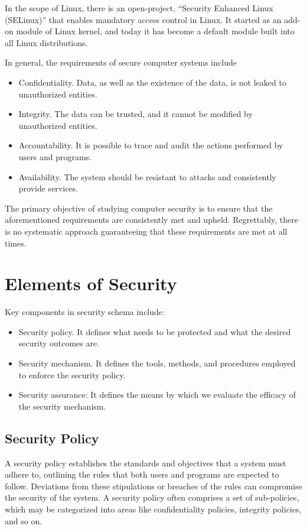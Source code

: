 In the scope of Linux, there is an open-project, ``Security Enhanced Linux (SELinux)'' that enables mandatory access control in Linux. It started as an add-on module of Linux kernel, and today it has become a default module built into all Linux distributions.

In general, the requirements of secure computer systems include
\begin{itemize}
	\item Confidentiality. Data, as well as the existence of the data, is not leaked to unauthorized entities.
	\item Integrity. The data can be trusted, and it cannot be modified by unauthorized entities.
	\item Accountability. It is possible to trace and audit the actions performed by users and programs.
	\item Availability. The system should be resistant to attacks and consistently provide services.
\end{itemize}
The primary objective of studying computer security is to ensure that the aforementioned requirements are consistently met and upheld. Regrettably, there is no systematic approach guaranteeing that these requirements are met at all times.

\section{Elements of Security}

Key components in security schema include:
\begin{itemize}
	\item Security policy. It defines what needs to be protected and what the desired security outcomes are.
	\item Security mechanism. It defines the tools, methods, and procedures employed to enforce the security policy.
	\item Security assurance: It defines the means by which we evaluate the efficacy of the security mechanism.
\end{itemize}

\subsection{Security Policy}

A security policy establishes the standards and objectives that a system must adhere to, outlining the rules that both users and programs are expected to follow. Deviations from these stipulations or breaches of the rules can compromise the security of the system. A security policy often comprises a set of sub-policies, which may be categorized into areas like confidentiality policies, integrity policies, and so on.

